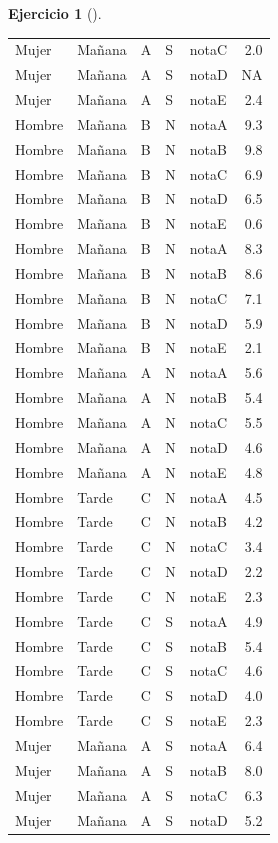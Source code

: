 \documentclass[
  a4paper,
]{scrreport}
\theoremstyle{definition}
\newtheorem{exercise}{Ejercicio}[chapter]
\theoremstyle{remark}
\begin{document}
\begin{exercise}[]
\begin{enumerate}
\begin{tcolorbox}
\begin{longtable}[]{@{}lllllr@{}}
  Mujer & Mañana & A & S & notaC & 2.0 \\
  Mujer & Mañana & A & S & notaD & NA \\
  Mujer & Mañana & A & S & notaE & 2.4 \\
  Hombre & Mañana & B & N & notaA & 9.3 \\
  Hombre & Mañana & B & N & notaB & 9.8 \\
  Hombre & Mañana & B & N & notaC & 6.9 \\
  Hombre & Mañana & B & N & notaD & 6.5 \\
  Hombre & Mañana & B & N & notaE & 0.6 \\
  Hombre & Mañana & B & N & notaA & 8.3 \\
  Hombre & Mañana & B & N & notaB & 8.6 \\
  Hombre & Mañana & B & N & notaC & 7.1 \\
  Hombre & Mañana & B & N & notaD & 5.9 \\
  Hombre & Mañana & B & N & notaE & 2.1 \\
  Hombre & Mañana & A & N & notaA & 5.6 \\
  Hombre & Mañana & A & N & notaB & 5.4 \\
  Hombre & Mañana & A & N & notaC & 5.5 \\
  Hombre & Mañana & A & N & notaD & 4.6 \\
  Hombre & Mañana & A & N & notaE & 4.8 \\
  Hombre & Tarde & C & N & notaA & 4.5 \\
  Hombre & Tarde & C & N & notaB & 4.2 \\
  Hombre & Tarde & C & N & notaC & 3.4 \\
  Hombre & Tarde & C & N & notaD & 2.2 \\
  Hombre & Tarde & C & N & notaE & 2.3 \\
  Hombre & Tarde & C & S & notaA & 4.9 \\
  Hombre & Tarde & C & S & notaB & 5.4 \\
  Hombre & Tarde & C & S & notaC & 4.6 \\
  Hombre & Tarde & C & S & notaD & 4.0 \\
  Hombre & Tarde & C & S & notaE & 2.3 \\
  Mujer & Mañana & A & S & notaA & 6.4 \\
  Mujer & Mañana & A & S & notaB & 8.0 \\
  Mujer & Mañana & A & S & notaC & 6.3 \\
  Mujer & Mañana & A & S & notaD & 5.2 \\

\end{longtable}
\end{tcolorbox}
\end{enumerate}
\end{exercise}
\end{document}
